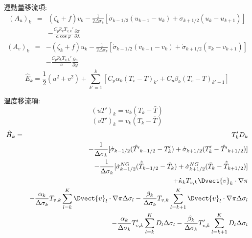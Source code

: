 運動量移流項:
\begin{eqnarray}
  (A_u)_k 
   & = & ( \zeta_k + f ) v_k 
             - \frac{1}{2 \Delta \sigma_k} 
             [   \dot{\sigma}_{k-1/2} ( u_{k-1} - u_k   )
               + \dot{\sigma}_{k+1/2} ( u_k   - u_{k+1} ) ]
           \nonumber \\
   &   &     - \frac{C_{p} \hat{\kappa}_k T_{v,k}'}{ a \cos \varphi} 
                  \frac{\partial \pi}{\partial \lambda} 
\end{eqnarray}
%
\begin{eqnarray}
  (A_v)_k 
   & = & - ( \zeta_k + f ) u_k 
             - \frac{1}{2 \Delta \sigma_k} 
             [   \dot{\sigma}_{k-1/2} ( v_{k-1} - v_k   )
               + \dot{\sigma}_{k+1/2} ( v_k   - v_{k+1} ) ]
           \nonumber \\
   &   &     - \frac{C_{p} \hat{\kappa}_k T_{v,k}'}{a} 
             \frac{\partial \pi}{\partial \varphi} 
\end{eqnarray}
\begin{equation}
 \hat{E}_k    
  = \frac{1}{2} ( u^2 + v^2 ) 
    +  \sum_{k'=1}^{k} \left[  C_p \alpha_k ( T_v - T )_{k'}
                              + C_p \beta_k ( T_v - T )_{k'-1} \right]
\end{equation}

温度移流項:
\begin{equation}
 (u T')_k  = u_k (T_k - \bar{T} )
\end{equation}
\begin{equation}
 (v T')_k  = v_k (T_k - \bar{T} )
\end{equation}
%
\begin{eqnarray}
 \hat{H}_k & = & T_{k}^{\prime} D_{k} \nonumber \\
     &   & - \frac{1}{\Delta \sigma_{k}} 
             [   \dot{\sigma}_{k-1/2} ( \hat{T^{\prime}}_{k-1/2} 
                                         - T^{\prime}_{k}   )
               + \dot{\sigma}_{k+1/2} ( T^{\prime}_{k}  
                                         - \hat{T^{\prime}}_{k+1/2} ) ]
               \nonumber \\
     &   & - \frac{1}{\Delta \sigma_{k}} 
             [   \dot{\sigma}^{NG}_{k-1/2} ( \hat{\bar{T}}_{k-1/2} 
                                         - \bar{T}_{k}   )
               + \dot{\sigma}^{NG}_{k+1/2} ( \bar{T}_{k}  
                                         - \hat{\bar{T}}_{k+1/2} ) ]
               \nonumber \\
     &   & + \hat{\kappa}_{k} T_{v,k} \Dvect{v}_{k} \cdot \nabla \pi
               \nonumber \\
     &   & - \frac{\alpha_{k}}{\Delta \sigma_{k} } T_{v,k}
             \sum_{l=k}^{K} \Dvect{v}_{l} \cdot \nabla \pi 
               \Delta \sigma_{l}
           - \frac{\beta_{k}}{\Delta \sigma_{k} } T_{v,k}
             \sum_{l=k+1}^{K} \Dvect{v}_{l} \cdot \nabla \pi 
               \Delta \sigma_{l}
               \nonumber \\
     &   & - \frac{\alpha_{k}}{\Delta \sigma_{k} } T'_{v,k}
             \sum_{l=k}^{K} D_l  \Delta \sigma_{l}
           - \frac{\beta_{k}}{\Delta \sigma_{k} } T'_{v,k}
             \sum_{l=k+1}^{K} D_l  \Delta \sigma_{l}
\end{eqnarray}

